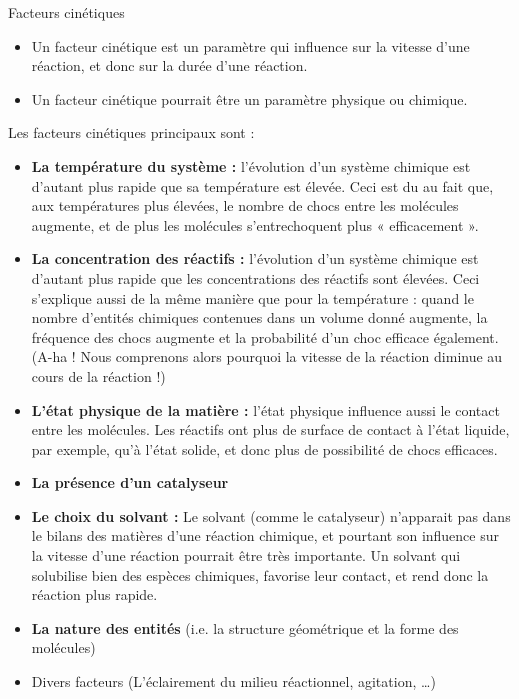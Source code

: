 \documentclass[11pt,a4paper]{article}
\begin{document}
\begin{defn}{Facteurs cinétiques}
\begin{itemize}
    \item Un facteur cinétique est un paramètre qui influence sur la vitesse d’une réaction, et donc sur la durée d’une réaction.
    \item Un facteur cinétique pourrait être un paramètre physique ou chimique.
\end{itemize}
\end{defn}
	
Les facteurs cinétiques principaux sont :
\begin{itemize}
        \item \textbf{La température du système : }l’évolution d’un système chimique est d’autant plus rapide que sa température est élevée. Ceci est du au fait que, aux températures plus élevées, le nombre de chocs entre les molécules augmente, et de plus  les molécules s’entrechoquent plus « efficacement ».
        \item \textbf{La concentration des réactifs : }l’évolution d’un système chimique est d’autant plus rapide que les concentrations des réactifs sont élevées. Ceci s’explique aussi de la même manière que pour la température : quand le nombre d’entités chimiques contenues dans un volume donné augmente, la fréquence des chocs augmente et la probabilité d’un choc efficace également.  (A-ha ! Nous comprenons alors pourquoi la vitesse de la réaction diminue au cours de la réaction !)
        \item \textbf{L’état physique de la matière :} l’état physique influence aussi le contact entre les molécules. Les réactifs ont plus de surface de contact à l’état liquide, par exemple, qu’à l’état solide, et donc plus de possibilité de chocs efficaces.
        \item \textbf{La présence d’un catalyseur }
        \item \textbf{Le choix du solvant : }Le solvant (comme le catalyseur) n’apparait pas dans le bilans des matières d’une réaction chimique, et pourtant son influence sur la vitesse d’une réaction pourrait être très importante. Un solvant qui solubilise bien des espèces chimiques, favorise leur contact, et rend donc la réaction plus rapide. 
        \item \textbf{La nature des entités }(i.e. la structure géométrique et la forme des molécules) 
        \item Divers facteurs (L’éclairement du milieu réactionnel, agitation, …)
    \end{itemize}
\end{document}
